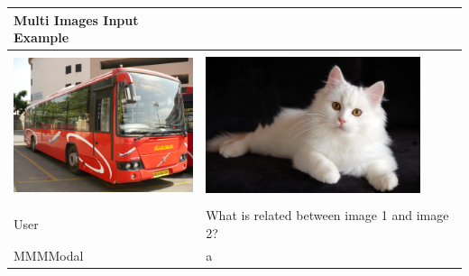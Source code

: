\documentclass[preprint]{article}
\begin{document}
\begin{table}[hbt]
  \centering
  \setlength{\extrarowheight}{3pt} %
  \renewcommand{\arraystretch}{1.5} %
  \begin{tabular}{p{6.5cm}p{6.5cm}}
    \hline
    \textbf{Multi Images Input Example}                                                                                            \\[6pt]
    \hline
    \hline
    \\[-1pt]
    \includegraphics[width=0.9\linewidth,height=4cm]{pic/bus.jpeg} & \includegraphics[width=0.9\linewidth,height=4cm]{pic/cat.jpg} \\
    \\[-1pt]
    \hline
    User                                                           & What is related between image 1 and image 2?                  \\
    MMMModal                                                       & a                                                             \\
    \hline
  \end{tabular}
\end{table}
\end{document}
